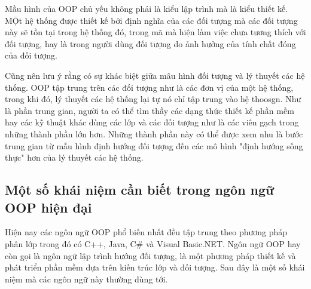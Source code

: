 \documentclass[10pt, a4paper]{article}
\begin{document}
Mầu hình của OOP chủ yếu không phải là kiểu lập trình mà là kiểu thiết kế. MỘt hệ thống được thiết kế bởi định nghĩa của các đối tượng mà các đối tượng này sẽ tồn tại trong hệ thống đó, trong mã mà hiện làm việc chưa tương thích với đối tượng, hay là trong người dùng đối tượng do ảnh hưởng của tính chất đóng của đối tượng.

Cũng nên lưu ý rằng có sự khác biệt giữa mâu hình đối tượng và lý thuyết các hệ thống. OOP tập trung trên các đối tượng như là các đơn vị của một hệ thống, trong khi đó, lý thuyết các hệ thống lại tự nó chỉ tập trung vào hệ thoosgn. Như là phần trung gian, người ta có thể tìm thầy các dạng thức thiết kế phần mềm hay các kỹ thuật khác dùng các lớp và các đối tượng như là các viên gạch trong những thành phần lớn hơn. Những thành phần này có thể được xem nhu là bước trung gian từ mẫu hình định hướng đối tượng đến các mô hình "định hướng sống thực" hơn của lý thuyết các hệ thống.

\subsection{Một số khái niệm cần biết trong ngôn ngữ OOP hiện đại}

Hiện nay các ngôn ngữ OOP phổ biến nhất đều tập trung theo phương pháp phân lớp trong đó có C++, Java, C\# và Visual Basic.NET. Ngôn ngữ OOP hay còn gọi là ngôn ngữ lập trình hướng đối tượng, là một phương pháp thiết kế và phát triển phần mềm dựa trên kiến trúc lớp và đối tượng. Sau đây là một số khái niệm mà các ngôn ngữ này thường dùng tới.
\end{document}

